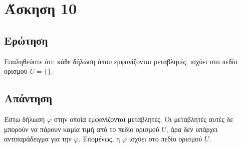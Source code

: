 \documentclass{article}
\begin{document}
\section*{Άσκηση 10}
\subsection*{Ερώτηση}
Επαληθεύστε ότι: κάθε δήλωση όπου εμφανίζονται μεταβλητές, ισχύει στο πεδίο ορισμού $U = \{ \}$.

\subsection*{Απάντηση}
Έστω δήλωση $φ$ στην οποία εμφανίζονται μεταβλητές. Οι μεταβλητές αυτές δε μπορούν να πάρουν καμία τιμή από το πεδίο ορισμού $U$, άρα δεν υπάρχει αντιπαράδειγμα για την $φ$. Επομένως, η $φ$ ισχύει στο πεδίο ορισμού $U$.
\end{document}

